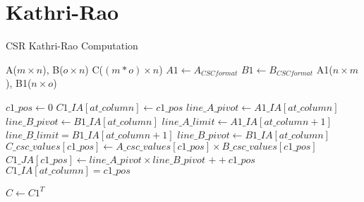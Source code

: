 \documentclass{article}
\begin{document}
\section{Kathri-Rao}
\begin{algorithm}
\caption{CSR Kathri-Rao Computation}\label{krao}
\begin{algorithmic}[1]

\Require A($m\times n$), B($o\times n$)
\Ensure C($(m * o) \times n$)
\Statex
\State $A1 \gets A_{CSC format}$
\State $B1 \gets B_{CSC format}$
\Statex
\Require A1($n\times m$), B1($n\times o$)
\Statex

\State $c1\_pos \gets 0$
    \State $C1\_IA[at\_column] \gets c1\_pos$
    \State $line\_A\_pivot \gets A1\_IA[at\_column]$
    \State $line\_B\_pivot \gets B1\_IA[at\_column]$
    \State $line\_A\_limit \gets A1\_IA[at\_column+1]$
    \State $line\_B\_limit = B1\_IA[at\_column+1]$
    \Statex
		\State $line\_B\_pivot \gets B1\_IA[at\_column]$
			\State $C\_csc\_values[c1\_pos]  \gets A\_csc\_values[c1\_pos] \times B\_csc\_values[c1\_pos]$
			\State $C1\_JA[c1\_pos] \gets line\_A\_pivot \times line\_B\_pivot$
			\State $++c1\_pos$
		\EndFor
	\EndFor
\EndFor
\Statex
\State $C1\_IA[at\_column]=c1\_pos$

\Statex
\State $C \gets C1^{T}$

\end{algorithmic}
\end{algorithm}


\newpage
\end{document}
